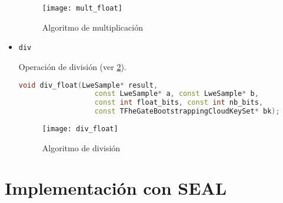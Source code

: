 \begin{itemize}
  \begin{figure}[h]
    \caption{Algoritmo de multiplicación}
    \label{fig:mult_float}
    \texttt{[image: mult\_float]}
  \end{figure}


  \item \texttt{div}

  Operación de división (ver \ref{fig:div_float}).

  \begin{lstlisting}[language=c++]
  void div_float(LweSample* result,
                  const LweSample* a, const LweSample* b,
                  const int float_bits, const int nb_bits,
                  const TFheGateBootstrappingCloudKeySet* bk);
  \end{lstlisting}

  \begin{figure}[h]
    \caption{Algoritmo de división}
    \label{fig:div_float}
    \texttt{[image: div\_float]}
  \end{figure}


\end{itemize}

\section{Implementación con SEAL}

